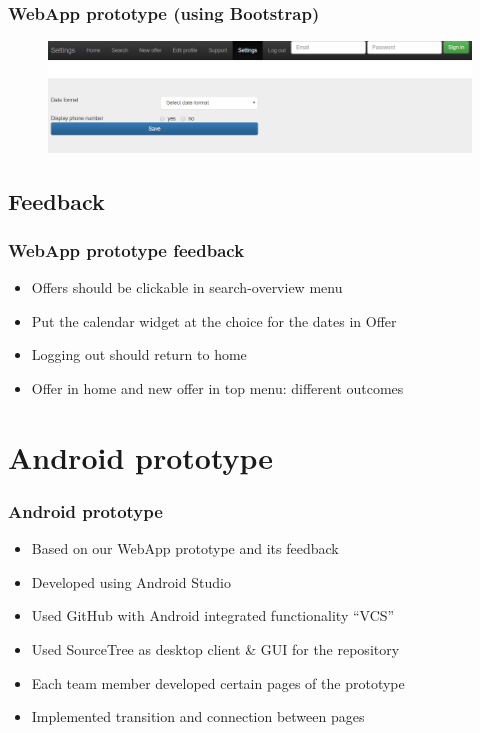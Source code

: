 \documentclass{beamer}
\begin{document}

\begin{frame}
\frametitle{WebApp prototype (using Bootstrap)}
\begin{figure}
\includegraphics[width=\textwidth]{png/webapp-settings.png}
\end{figure}
\end{frame}


\subsection{Feedback} %


\begin{frame}
\frametitle{WebApp prototype feedback}
\begin{itemize}
\item Offers should be clickable in search-overview menu
\item Put the calendar widget at the choice for the dates in Offer
\item Logging out should return to home
\item Offer in home and new offer in top menu: different outcomes
\end{itemize}
\end{frame}


\section{Android prototype}


\begin{frame}
\frametitle{Android prototype}
\begin{itemize}
\item Based on our WebApp prototype and its feedback
\item Developed using Android Studio
\item Used GitHub with Android integrated functionality ``VCS''
\item Used SourceTree as desktop client \& GUI for the repository
\item Each team member developed certain pages of the prototype
\item Implemented transition and connection between pages
\end{itemize}
\end{frame}
\end{document}
